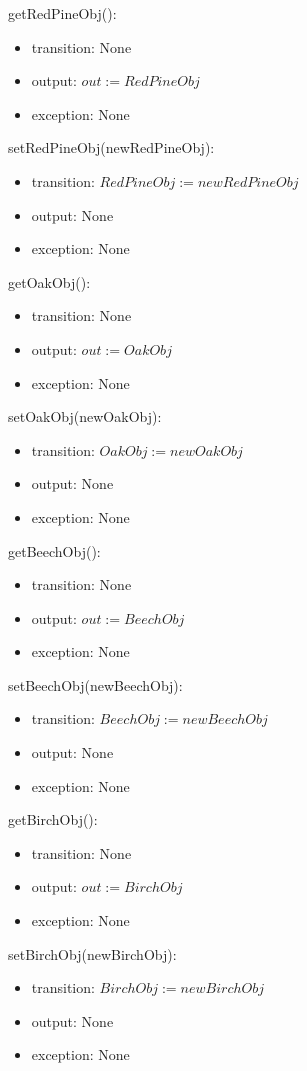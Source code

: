 \documentclass[12pt, titlepage]{article}
\begin{document}
\renewcommand{\attr}{RedPineObj}
\noindent get\attr():
\begin{itemize}
\item transition: None
\item output: $\mathit{out := \attr}$
\item exception: None
\end{itemize}
\noindent set\attr(new\attr):
\begin{itemize}
\item transition: $\mathit{\attr := new\attr}$
\item output: None
\item exception: None
\end{itemize}
\renewcommand{\attr}{OakObj}
\noindent get\attr():
\begin{itemize}
\item transition: None
\item output: $\mathit{out := \attr}$
\item exception: None
\end{itemize}
\noindent set\attr(new\attr):
\begin{itemize}
\item transition: $\mathit{\attr := new\attr}$
\item output: None
\item exception: None
\end{itemize}
\renewcommand{\attr}{BeechObj}
\noindent get\attr():
\begin{itemize}
\item transition: None
\item output: $\mathit{out := \attr}$
\item exception: None
\end{itemize}
\noindent set\attr(new\attr):
\begin{itemize}
\item transition: $\mathit{\attr := new\attr}$
\item output: None
\item exception: None
\end{itemize}
\renewcommand{\attr}{BirchObj}
\noindent get\attr():
\begin{itemize}
\item transition: None
\item output: $\mathit{out := \attr}$
\item exception: None
\end{itemize}
\noindent set\attr(new\attr):
\begin{itemize}
\item transition: $\mathit{\attr := new\attr}$
\item output: None
\item exception: None
\end{itemize}
\end{document}
